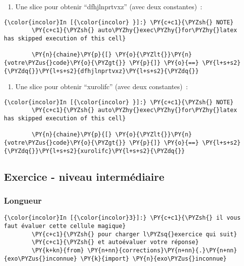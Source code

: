     \begin{enumerate}
\def\labelenumi{\arabic{enumi})}
\setcounter{enumi}{2}
\tightlist
\item
  Une slice pour obtenir ``dfhjlnprtvxz'' (avec deux constantes)~:
\end{enumerate}

    \begin{Verbatim}[commandchars=\\\{\}]
{\color{incolor}In [{\color{incolor} }]:} \PY{c+c1}{\PYZsh{} NOTE}
        \PY{c+c1}{\PYZsh{} auto\PYZhy{}exec\PYZhy{}for\PYZhy{}latex has skipped execution of this cell}
        
        \PY{n}{chaine}\PY{p}{[} \PY{o}{\PYZlt{}}\PY{n}{votre\PYZus{}code}\PY{o}{\PYZgt{}} \PY{p}{]} \PY{o}{==} \PY{l+s+s2}{\PYZdq{}}\PY{l+s+s2}{dfhjlnprtvxz}\PY{l+s+s2}{\PYZdq{}}
\end{Verbatim}


    \begin{enumerate}
\def\labelenumi{\arabic{enumi})}
\setcounter{enumi}{3}
\tightlist
\item
  Une slice pour obtenir ``xurolifc'' (avec deux constantes)~:
\end{enumerate}

    \begin{Verbatim}[commandchars=\\\{\}]
{\color{incolor}In [{\color{incolor} }]:} \PY{c+c1}{\PYZsh{} NOTE}
        \PY{c+c1}{\PYZsh{} auto\PYZhy{}exec\PYZhy{}for\PYZhy{}latex has skipped execution of this cell}
        
        \PY{n}{chaine}\PY{p}{[} \PY{o}{\PYZlt{}}\PY{n}{votre\PYZus{}code}\PY{o}{\PYZgt{}} \PY{p}{]} \PY{o}{==} \PY{l+s+s2}{\PYZdq{}}\PY{l+s+s2}{xurolifc}\PY{l+s+s2}{\PYZdq{}}
\end{Verbatim}


    \hypertarget{exercice---niveau-intermuxe9diaire}{%
\subsection{Exercice - niveau
intermédiaire}\label{exercice---niveau-intermuxe9diaire}}

    \hypertarget{longueur}{%
\subsubsection{Longueur}\label{longueur}}

    \begin{Verbatim}[commandchars=\\\{\}]
{\color{incolor}In [{\color{incolor}3}]:} \PY{c+c1}{\PYZsh{} il vous faut évaluer cette cellule magique}
        \PY{c+c1}{\PYZsh{} pour charger l\PYZsq{}exercice qui suit}
        \PY{c+c1}{\PYZsh{} et autoévaluer votre réponse}
        \PY{k+kn}{from} \PY{n+nn}{corrections}\PY{n+nn}{.}\PY{n+nn}{exo\PYZus{}inconnue} \PY{k}{import} \PY{n}{exo\PYZus{}inconnue}
\end{Verbatim}


